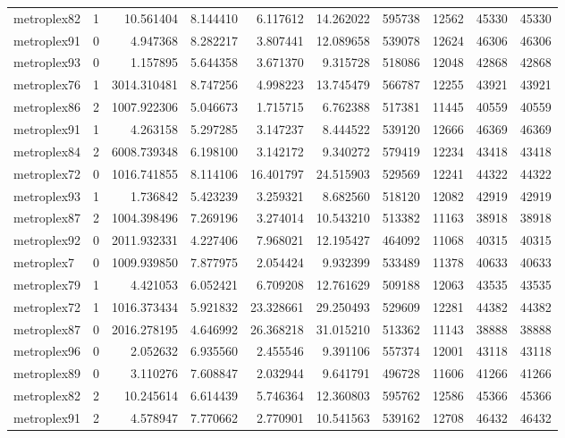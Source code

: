 \begin{longtable}{|l|r|r|r|r|r|r|r|r|r|}
metroplex82 & 1 & 10.561404 & 8.144410 & 6.117612 & 14.262022 & 595738 & 12562 & 45330 & 45330 \\
metroplex91 & 0 & 4.947368 & 8.282217 & 3.807441 & 12.089658 & 539078 & 12624 & 46306 & 46306 \\
metroplex93 & 0 & 1.157895 & 5.644358 & 3.671370 & 9.315728 & 518086 & 12048 & 42868 & 42868 \\
metroplex76 & 1 & 3014.310481 & 8.747256 & 4.998223 & 13.745479 & 566787 & 12255 & 43921 & 43921 \\
metroplex86 & 2 & 1007.922306 & 5.046673 & 1.715715 & 6.762388 & 517381 & 11445 & 40559 & 40559 \\
metroplex91 & 1 & 4.263158 & 5.297285 & 3.147237 & 8.444522 & 539120 & 12666 & 46369 & 46369 \\
metroplex84 & 2 & 6008.739348 & 6.198100 & 3.142172 & 9.340272 & 579419 & 12234 & 43418 & 43418 \\
metroplex72 & 0 & 1016.741855 & 8.114106 & 16.401797 & 24.515903 & 529569 & 12241 & 44322 & 44322 \\
metroplex93 & 1 & 1.736842 & 5.423239 & 3.259321 & 8.682560 & 518120 & 12082 & 42919 & 42919 \\
metroplex87 & 2 & 1004.398496 & 7.269196 & 3.274014 & 10.543210 & 513382 & 11163 & 38918 & 38918 \\
metroplex92 & 0 & 2011.932331 & 4.227406 & 7.968021 & 12.195427 & 464092 & 11068 & 40315 & 40315 \\
metroplex7 & 0 & 1009.939850 & 7.877975 & 2.054424 & 9.932399 & 533489 & 11378 & 40633 & 40633 \\
metroplex79 & 1 & 4.421053 & 6.052421 & 6.709208 & 12.761629 & 509188 & 12063 & 43535 & 43535 \\
metroplex72 & 1 & 1016.373434 & 5.921832 & 23.328661 & 29.250493 & 529609 & 12281 & 44382 & 44382 \\
metroplex87 & 0 & 2016.278195 & 4.646992 & 26.368218 & 31.015210 & 513362 & 11143 & 38888 & 38888 \\
metroplex96 & 0 & 2.052632 & 6.935560 & 2.455546 & 9.391106 & 557374 & 12001 & 43118 & 43118 \\
metroplex89 & 0 & 3.110276 & 7.608847 & 2.032944 & 9.641791 & 496728 & 11606 & 41266 & 41266 \\
metroplex82 & 2 & 10.245614 & 6.614439 & 5.746364 & 12.360803 & 595762 & 12586 & 45366 & 45366 \\
metroplex91 & 2 & 4.578947 & 7.770662 & 2.770901 & 10.541563 & 539162 & 12708 & 46432 & 46432 \\

\end{longtable}
